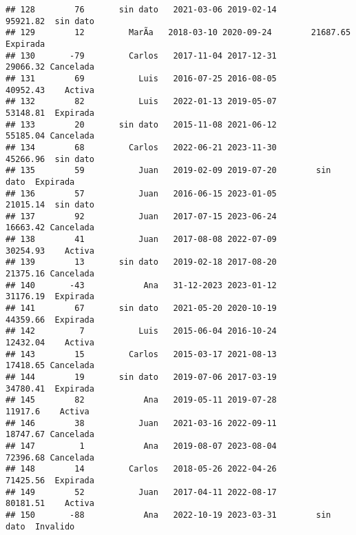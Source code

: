\documentclass[
]{article}
\begin{document}
\begin{verbatim}
## 128        76       sin dato   2021-03-06 2019-02-14        95921.82  sin dato
## 129        12         MarÃ­a   2018-03-10 2020-09-24        21687.65  Expirada
## 130       -79         Carlos   2017-11-04 2017-12-31        29066.32 Cancelada
## 131        69           Luis   2016-07-25 2016-08-05        40952.43    Activa
## 132        82           Luis   2022-01-13 2019-05-07        53148.81  Expirada
## 133        20       sin dato   2015-11-08 2021-06-12        55185.04 Cancelada
## 134        68         Carlos   2022-06-21 2023-11-30        45266.96  sin dato
## 135        59           Juan   2019-02-09 2019-07-20        sin dato  Expirada
## 136        57           Juan   2016-06-15 2023-01-05        21015.14  sin dato
## 137        92           Juan   2017-07-15 2023-06-24        16663.42 Cancelada
## 138        41           Juan   2017-08-08 2022-07-09        30254.93    Activa
## 139        13       sin dato   2019-02-18 2017-08-20        21375.16 Cancelada
## 140       -43            Ana   31-12-2023 2023-01-12        31176.19  Expirada
## 141        67       sin dato   2021-05-20 2020-10-19        44359.66  Expirada
## 142         7           Luis   2015-06-04 2016-10-24        12432.04    Activa
## 143        15         Carlos   2015-03-17 2021-08-13        17418.65 Cancelada
## 144        19       sin dato   2019-07-06 2017-03-19        34780.41  Expirada
## 145        82            Ana   2019-05-11 2019-07-28         11917.6    Activa
## 146        38           Juan   2021-03-16 2022-09-11        18747.67 Cancelada
## 147         1            Ana   2019-08-07 2023-08-04        72396.68 Cancelada
## 148        14         Carlos   2018-05-26 2022-04-26        71425.56  Expirada
## 149        52           Juan   2017-04-11 2022-08-17        80181.51    Activa
## 150       -88            Ana   2022-10-19 2023-03-31        sin dato  Invalido
\end{verbatim}
\end{document}
